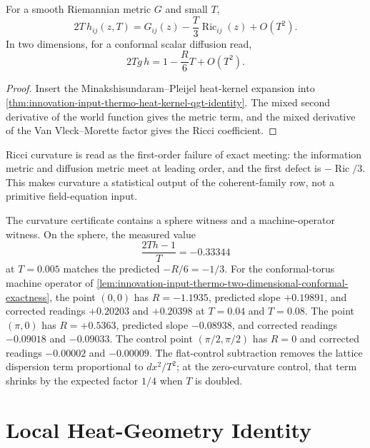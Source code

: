 \begin{theorem}
\label{thm:innovation-input-thermo-curvature-defect}
For a smooth Riemannian metric $G$ and small $T$,
$$
2T\,h_{ij}(z,T)
=
G_{ij}(z)-\frac{T}{3}\operatorname{Ric}_{ij}(z)+O(T^2).
$$
In two dimensions, for a conformal scalar diffusion read,
$$
2Tg\,h=1-\frac{R}{6}T+O(T^2).
$$
\end{theorem}

\begin{proof}
Insert the Minakshisundaram--Pleijel heat-kernel expansion into
\autoref{thm:innovation-input-thermo-heat-kernel-qgt-identity}. The mixed
second derivative of the world function gives the metric term, and the
mixed derivative of the Van Vleck--Morette factor gives the Ricci
coefficient.
\end{proof}

\begin{principle}
\label{prin:innovation-input-thermo-ricci-output}
Ricci curvature is read as the first-order failure of exact meeting:
the information metric and diffusion metric meet at leading order, and the
first defect is $-\operatorname{Ric}/3$. This makes curvature a statistical
output of the coherent-family row, not a primitive field-equation input.
\end{principle}

\begin{principle}
\label{prin:innovation-input-thermo-curvature-numerical-witnesses}
The curvature certificate contains a sphere witness and a machine-operator
witness. On the sphere, the measured value
$$
\frac{2Th-1}{T}=-0.33344
$$
at $T=0.005$ matches the predicted $-R/6=-1/3$. For the conformal-torus
machine operator of \autoref{lem:innovation-input-thermo-two-dimensional-conformal-exactness},
the point $(0,0)$ has $R=-1.1935$, predicted slope $+0.19891$, and
corrected readings $+0.20203$ and $+0.20398$ at $T=0.04$ and $T=0.08$.
The point $(\pi,0)$ has $R=+0.5363$, predicted slope $-0.08938$, and
corrected readings $-0.09018$ and $-0.09033$. The control point
$(\pi/2,\pi/2)$ has $R=0$ and corrected readings $-0.00002$ and
$-0.00009$. The flat-control subtraction removes the lattice dispersion
term proportional to $dx^2/T^2$; at the zero-curvature control, that term
shrinks by the expected factor $1/4$ when $T$ is doubled.
\end{principle}

\section{Local Heat-Geometry Identity}
\label{sec:innovation-input-thermo-local-heat-geometry}

